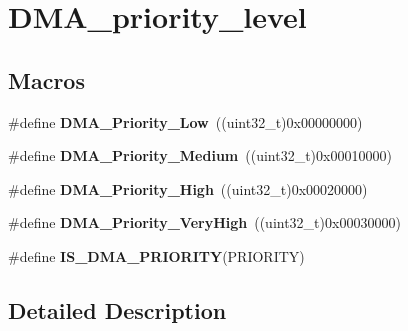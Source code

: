 \hypertarget{group___d_m_a__priority__level}{\section{D\-M\-A\-\_\-priority\-\_\-level}
\label{group___d_m_a__priority__level}
}
\subsection*{Macros}
\begin{DoxyCompactItemize}
\item 
\hypertarget{group___d_m_a__priority__level_gaf414e0aa8dd42aee6f83f88ab6175179}{\#define {\bfseries D\-M\-A\-\_\-\-Priority\-\_\-\-Low}~((uint32\-\_\-t)0x00000000)}\label{group___d_m_a__priority__level_gaf414e0aa8dd42aee6f83f88ab6175179}

\item 
\hypertarget{group___d_m_a__priority__level_ga8e0d4a958f4288c6c759945789490f38}{\#define {\bfseries D\-M\-A\-\_\-\-Priority\-\_\-\-Medium}~((uint32\-\_\-t)0x00010000)}\label{group___d_m_a__priority__level_ga8e0d4a958f4288c6c759945789490f38}

\item 
\hypertarget{group___d_m_a__priority__level_gae2441c0b4d4ba9945a6f4f7d08045a8e}{\#define {\bfseries D\-M\-A\-\_\-\-Priority\-\_\-\-High}~((uint32\-\_\-t)0x00020000)}\label{group___d_m_a__priority__level_gae2441c0b4d4ba9945a6f4f7d08045a8e}

\item 
\hypertarget{group___d_m_a__priority__level_gadccd2f8b2ac24ba4fd485dd5b9b48671}{\#define {\bfseries D\-M\-A\-\_\-\-Priority\-\_\-\-Very\-High}~((uint32\-\_\-t)0x00030000)}\label{group___d_m_a__priority__level_gadccd2f8b2ac24ba4fd485dd5b9b48671}

\item 
\#define {\bfseries I\-S\-\_\-\-D\-M\-A\-\_\-\-P\-R\-I\-O\-R\-I\-T\-Y}(P\-R\-I\-O\-R\-I\-T\-Y)
\end{DoxyCompactItemize}


\subsection{Detailed Description}


